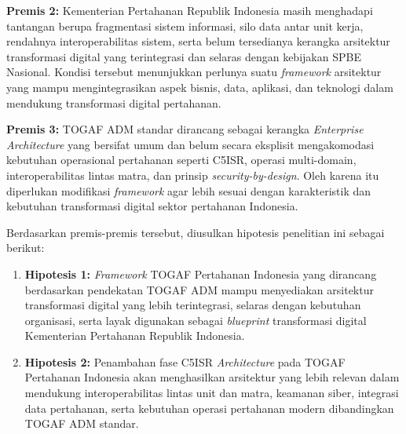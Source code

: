 \textbf{Premis 2:} Kementerian Pertahanan Republik Indonesia masih menghadapi tantangan berupa fragmentasi sistem informasi, silo data antar unit kerja, rendahnya interoperabilitas sistem, serta belum tersedianya kerangka arsitektur transformasi digital yang terintegrasi dan selaras dengan kebijakan SPBE Nasional.
Kondisi tersebut menunjukkan perlunya suatu \textit{framework} arsitektur yang mampu mengintegrasikan aspek bisnis, data, aplikasi, dan teknologi dalam mendukung transformasi digital pertahanan.

\textbf{Premis 3:} TOGAF ADM standar dirancang sebagai kerangka \textit{Enterprise Architecture} yang bersifat umum dan belum secara eksplisit mengakomodasi kebutuhan operasional pertahanan seperti C5ISR, operasi multi-domain, interoperabilitas lintas matra, dan prinsip \textit{security-by-design}.
Oleh karena itu diperlukan modifikasi \textit{framework} agar lebih sesuai dengan karakteristik dan kebutuhan transformasi digital sektor pertahanan Indonesia.

Berdasarkan premis-premis tersebut, diusulkan hipotesis penelitian ini sebagai berikut:
\begin{enumerate}
    \item \textbf{Hipotesis 1:} \textit{Framework} TOGAF Pertahanan Indonesia yang dirancang berdasarkan pendekatan TOGAF ADM mampu menyediakan arsitektur transformasi digital yang lebih terintegrasi, selaras dengan kebutuhan organisasi, serta layak digunakan sebagai \textit{blueprint} transformasi digital Kementerian Pertahanan Republik Indonesia.
    \item \textbf{Hipotesis 2:} Penambahan fase C5ISR \textit{Architecture} pada TOGAF Pertahanan Indonesia akan menghasilkan arsitektur yang lebih relevan dalam mendukung interoperabilitas lintas unit dan matra, keamanan siber, integrasi data pertahanan, serta kebutuhan operasi pertahanan modern dibandingkan TOGAF ADM standar.
\end{enumerate}



